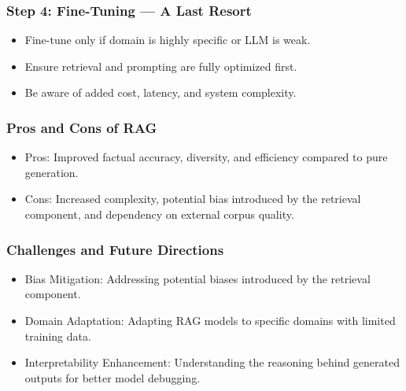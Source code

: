 \begin{frame}[fragile]\frametitle{Step 4: Fine-Tuning — A Last Resort}
      \begin{itemize}
        \item Fine-tune only if domain is highly specific or LLM is weak.
        \item Ensure retrieval and prompting are fully optimized first.
        \item Be aware of added cost, latency, and system complexity.
      \end{itemize}
\end{frame}



\begin{frame}[fragile]\frametitle{Pros and Cons of RAG}

\begin{itemize}
\item Pros: Improved factual accuracy, diversity, and efficiency compared to pure generation.
\item Cons: Increased complexity, potential bias introduced by the retrieval component, and dependency on external corpus quality.
\end{itemize}	

\end{frame}

\begin{frame}[fragile]\frametitle{Challenges and Future Directions}

\begin{itemize}
\item Bias Mitigation: Addressing potential biases introduced by the retrieval component.
\item Domain Adaptation: Adapting RAG models to specific domains with limited training data.
\item Interpretability Enhancement: Understanding the reasoning behind generated outputs for better model debugging.
\end{itemize}	

\end{frame}